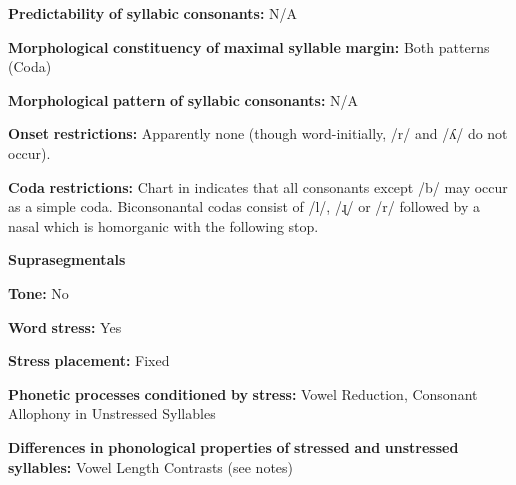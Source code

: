 \begin{styleBody}
\textbf{Predictability} \textbf{of} \textbf{syllabic} \textbf{consonants:} N/A
\end{styleBody}

\begin{styleBody}
\textbf{Morphological} \textbf{constituency} \textbf{of} \textbf{maximal} \textbf{syllable} \textbf{margin:} Both patterns (Coda)
\end{styleBody}

\begin{styleBody}
\textbf{Morphological} \textbf{pattern} \textbf{of} \textbf{syllabic} \textbf{consonants:} N/A
\end{styleBody}

\begin{styleBody}
\textbf{Onset} \textbf{restrictions:} Apparently none (though word-initially, /r/ and /ʎ/ do not occur).
\end{styleBody}

\begin{styleBody}
\textbf{Coda} \textbf{restrictions:} Chart in \citet[102]{Bowern2012} indicates that all consonants except /b/ may occur as a simple coda. Biconsonantal codas consist of /l/, /ɻ/ or /r/ followed by a nasal which is homorganic with the following stop.
\end{styleBody}

\begin{styleBody}
\textbf{Suprasegmentals}
\end{styleBody}

\begin{styleBody}
\textbf{Tone:} No
\end{styleBody}

\begin{styleBody}
\textbf{Word} \textbf{stress:} Yes
\end{styleBody}

\begin{styleBody}
\textbf{Stress} \textbf{placement:} Fixed
\end{styleBody}

\begin{styleBody}
\textbf{Phonetic} \textbf{processes} \textbf{conditioned} \textbf{by} \textbf{stress:} Vowel Reduction, Consonant Allophony in Unstressed Syllables
\end{styleBody}

\begin{styleBody}
\textbf{Differences} \textbf{in} \textbf{phonological} \textbf{properties} \textbf{of} \textbf{stressed} \textbf{and} \textbf{unstressed} \textbf{syllables:} Vowel Length Contrasts (see notes)
\end{styleBody}

